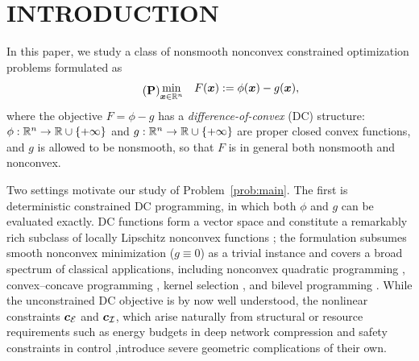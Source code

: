 \section{INTRODUCTION}
In this paper, we study a class of nonsmooth nonconvex constrained
optimization problems formulated as
\begin{equation}
\tag{{\bf P}}
\label{prob:main}
\begin{alignedat}{3}
   \min\limits_{\bx \in \RR^n} \quad
      & F(\bx) &&:= \phi(\bx) - g(\bx),
\end{alignedat}
\end{equation}
where the objective $F = \phi - g$ has a \emph{difference-of-convex}
(DC) structure: $\phi:\mathbb{R}^n\to\mathbb{R}\cup\{+\infty\}$ and
$g:\mathbb{R}^n\to\mathbb{R}\cup\{+\infty\}$ are proper closed convex functions, and
$g$ is allowed to be nonsmooth, so that $F$ is in general both
nonsmooth and nonconvex. 

Two settings motivate our study of Problem~\eqref{prob:main}. The first is deterministic constrained DC programming, in which both
$\phi$ and $g$ can be evaluated exactly. DC functions form a vector
space and constitute a remarkably rich subclass of locally Lipschitz
nonconvex functions \citep{Zhang-2020-Complexity,kong2024cost,davis2022gradient}; the formulation subsumes smooth nonconvex minimization ($g \equiv 0$) as a
trivial instance and covers a broad spectrum of classical
applications, including nonconvex quadratic programming
\citep{lethi1997solving,lethi1998branch}, convex--concave programming
\citep{yuille2003concave,shen2016disciplined}, kernel selection \citep{argyriou2006dc},
and bilevel programming \citep{lethi2009dc}. While the unconstrained DC
objective is by now well understood, the nonlinear constraints
$\bm{c}_{\mathcal{E}}$ and $\bm{c}_{\mathcal{I}}$, which arise naturally from
structural or resource requirements such as energy budgets in deep
network compression \citep{yang2019ecc,chen2018constraint} and safety
constraints in control \citep{paternain2019constrained},introduce
severe geometric complications of their own.

